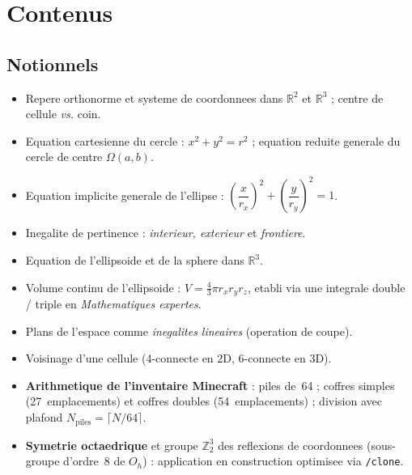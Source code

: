 \documentclass[12pt,a4paper]{scrartcl}
\newcommand{\acc}[1]{\textcolor{accent}{\textbf{#1}}}
\newcommand{\cmd}[1]{\textcolor{earth}{\texttt{\small #1}}}
\begin{document}
\section{Contenus}\label{sec:conteudos}

\subsection{Notionnels}
\begin{itemize}[leftmargin=1.3em,itemsep=0.15em,topsep=0.3em]
  \item Repere orthonorme et systeme de coordonnees dans $\mathbb{R}^2$ et $\mathbb{R}^3$ ; centre de cellule \emph{vs.} coin.
  \item Equation cartesienne du cercle : $x^2 + y^2 = r^2$ ; equation reduite generale du cercle de centre $\Omega(a, b)$.
  \item Equation implicite generale de l'ellipse : $\left(\dfrac{x}{r_x}\right)^{\!2} + \left(\dfrac{y}{r_y}\right)^{\!2} = 1$.
  \item Inegalite de pertinence : \emph{interieur, exterieur} et \emph{frontiere}.
  \item Equation de l'ellipsoide et de la sphere dans $\mathbb{R}^3$.
  \item Volume continu de l'ellipsoide : $V = \tfrac{4}{3}\pi r_x r_y r_z$, etabli via une integrale double / triple en \emph{Mathematiques expertes}.
  \item Plans de l'espace comme \emph{inegalites lineaires} (operation de coupe).
  \item Voisinage d'une cellule (4-connecte en 2D, 6-connecte en 3D).
  \item \acc{Arithmetique de l'inventaire Minecraft} : piles de~64 ; coffres simples (27~emplacements) et coffres doubles (54~emplacements) ; division avec plafond $N_{\mathrm{piles}} = \lceil N/64 \rceil$.
  \item \acc{Symetrie octaedrique} et groupe $\mathbb{Z}_2^3$ des reflexions de coordonnees (sous-groupe d'ordre~8 de $O_h$) : application en construction optimisee via \cmd{/clone}.
\end{itemize}
\end{document}
